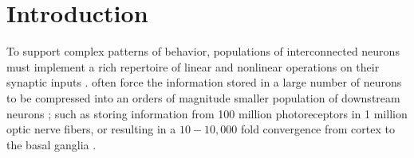 \section*{Introduction}
\label{sec:introduction}

To support complex patterns of behavior, 
populations of interconnected neurons must implement 
a rich repertoire of linear and nonlinear operations on their synaptic inputs
\cite{Koch1999}.
often force the information stored in a large number of neurons
to be compressed into an orders of magnitude smaller population
of downstream neurons
\cite{Kempermann2002,BarGad2003_Review,Babinsky1993};
such as storing information from 100 million photoreceptors 
in 1 million optic nerve fibers,
or resulting in a $10 - 10,000$ fold convergence from cortex to the basal ganglia
\cite{BarGad2003_Review}.

